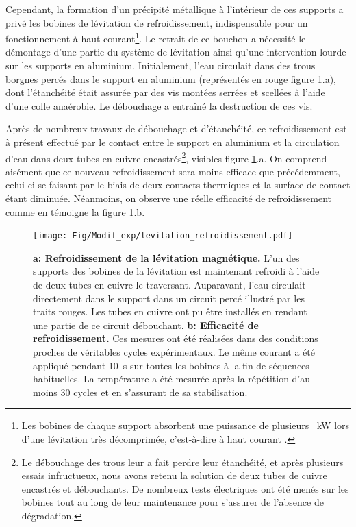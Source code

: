 Cependant, la formation d'un précipité métallique à l'intérieur de ces supports a privé les bobines de lévitation de refroidissement, indispensable pour un fonctionnement à haut courant\footnote{Les bobines de chaque support absorbent une puissance de plusieurs \SI{}{\kilo\watt} lors d'une lévitation très décomprimée, c'est-à-dire à haut courant \citep{bernard2010transport}.}. Le retrait de ce bouchon a nécessité le démontage d'une partie du système de lévitation ainsi qu'une intervention lourde sur les supports en aluminium. Initialement, l'eau circulait dans des trous borgnes percés dans le support en aluminium (représentés en rouge figure \ref{fig:refroidissement_levitation}.a), dont l'étanchéité était assurée par des vis montées serrées et scellées à l'aide d'une colle anaérobie. Le débouchage a entraîné la destruction de ces vis.

Après de nombreux travaux de débouchage et d'étanchéité, ce refroidissement est à présent effectué par le contact entre le support en aluminium et la circulation d'eau dans deux tubes en cuivre encastrés\footnote{Le débouchage des trous leur a fait perdre leur étanchéité, et après plusieurs essais infructueux, nous avons retenu la solution de deux tubes de cuivre encastrés et débouchants. De nombreux tests électriques ont été menés sur les bobines tout au long de leur maintenance pour s'assurer de l'absence de dégradation.}, visibles figure \ref{fig:refroidissement_levitation}.a. On comprend aisément que ce nouveau refroidissement sera moins efficace que précédemment, celui-ci se faisant par le biais de deux contacts thermiques et la surface de contact étant diminuée. Néanmoins, on observe une réelle efficacité de refroidissement comme en témoigne la figure \ref{fig:refroidissement_levitation}.b.

\begin{figure}[!ht]
\centering
\texttt{[image: Fig/Modif\_exp/levitation\_refroidissement.pdf]}
\caption{\textbf{a: Refroidissement de la lévitation magnétique.} L'un des supports des bobines de la lévitation est maintenant refroidi à l'aide de deux tubes en cuivre le traversant. Auparavant, l'eau circulait directement dans le support dans un circuit percé illustré par les traits rouges. Les tubes en cuivre ont pu être installés en rendant une partie de ce circuit débouchant. \textbf{b: Efficacité de refroidissement.} Ces mesures ont été réalisées dans des conditions proches de véritables cycles expérimentaux. Le même courant a été appliqué pendant \SI{10}{\second} sur toutes les bobines à la fin de séquences habituelles. La température a été mesurée après la répétition d'au moins 30 cycles et en s'assurant de sa stabilisation.}
\label{fig:refroidissement_levitation}
\end{figure}










